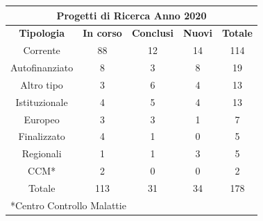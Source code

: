 \documentclass[
  12pt,
]{article}
\begin{document}
\begin{center}
\begin{table}[H]
\begin{tabular}{ccccc}
\multicolumn{5}{c}{\textbf{Progetti di Ricerca Anno 2020}}                                                                                     \\ \hline
\multicolumn{1}{|c|}{\textbf{Tipologia}} &
  \multicolumn{1}{c|}{\textbf{In corso}} &
  \multicolumn{1}{c|}{\textbf{Conclusi}} &
  \multicolumn{1}{c|}{\textbf{Nuovi}} &
  \multicolumn{1}{c|}{\textbf{Totale}} \\ \hline
\multicolumn{1}{|c|}{Corrente}       & \multicolumn{1}{c|}{88}  & \multicolumn{1}{c|}{12} & \multicolumn{1}{c|}{14} & \multicolumn{1}{c|}{114} \\ \hline
\multicolumn{1}{|c|}{Autofinanziato} & \multicolumn{1}{c|}{8}   & \multicolumn{1}{c|}{3}  & \multicolumn{1}{c|}{8}  & \multicolumn{1}{c|}{19}  \\ \hline
\multicolumn{1}{|c|}{Altro tipo}     & \multicolumn{1}{c|}{3}   & \multicolumn{1}{c|}{6}  & \multicolumn{1}{c|}{4}  & \multicolumn{1}{c|}{13}  \\ \hline
\multicolumn{1}{|c|}{Istituzionale}  & \multicolumn{1}{c|}{4}   & \multicolumn{1}{c|}{5}  & \multicolumn{1}{c|}{4}  & \multicolumn{1}{c|}{13}  \\ \hline
\multicolumn{1}{|c|}{Europeo}        & \multicolumn{1}{c|}{3}   & \multicolumn{1}{c|}{3}  & \multicolumn{1}{c|}{1}  & \multicolumn{1}{c|}{7}   \\ \hline
\multicolumn{1}{|c|}{Finalizzato}    & \multicolumn{1}{c|}{4}   & \multicolumn{1}{c|}{1}  & \multicolumn{1}{c|}{0}  & \multicolumn{1}{c|}{5}   \\ \hline
\multicolumn{1}{|c|}{Regionali}      & \multicolumn{1}{c|}{1}   & \multicolumn{1}{c|}{1}  & \multicolumn{1}{c|}{3}  & \multicolumn{1}{c|}{5}   \\ \hline
\multicolumn{1}{|c|}{CCM*}           & \multicolumn{1}{c|}{2}   & \multicolumn{1}{c|}{0}  & \multicolumn{1}{c|}{0}  & \multicolumn{1}{c|}{2}   \\ \hline
\multicolumn{1}{|c|}{Totale}         & \multicolumn{1}{c|}{113} & \multicolumn{1}{c|}{31} & \multicolumn{1}{c|}{34} & \multicolumn{1}{c|}{178} \\ \hline
\multicolumn{5}{l}{*Centro Controllo Malattie}                                                                                                
\end{tabular}
\end{table}
\end{center}
\end{document}
